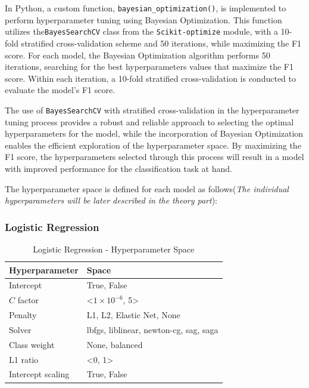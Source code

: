 In Python, a custom function, \lstinline{bayesian_optimization()}, is implemented to perform hyperparameter tuning using Bayesian Optimization.
This function utilizes the\lstinline{BayesSearchCV} class from the \lstinline{Scikit-optimize} module, with a 10-fold stratified cross-validation scheme and 50 iterations, while maximizing the F1 score.
For each model, the Bayesian Optimization algorithm performs 50 iterations, searching for the best hyperparameters values that maximize the F1 score. Within each iteration, a 10-fold stratified cross-validation is conducted to evaluate the model's F1 score.

The use of \lstinline{BayesSearchCV} with stratified cross-validation in the hyperparameter tuning process provides a robust and reliable approach to selecting the optimal hyperparameters for the model, while the incorporation of Bayesian Optimization enables the efficient exploration of the hyperparameter space.
By maximizing the F1 score, the hyperparameters selected through this process will result in a model with improved performance for the classification task at hand.

The hyperparameter space is defined for each model as follows(\textit{The individual hyperparameters will be later described in the theory part}):
\subsubsection{Logistic Regression}

\begin{table}[H]
    \small
    \setlength{\tabcolsep}{8pt}
    \renewcommand{\arraystretch}{1.3}
    \centering
        \caption[Logistic Regression - Hyperparameter Space]{Logistic Regression - Hyperparameter Space}\label{tab:lrspace}
        \begin{tabular}{ll}
    \toprule
    \textbf{Hyperparameter} & \textbf{Space}\\
    \midrule
    \hline
    Intercept & True, False \\
    $C$ factor & <$1\times10^{-6}$, 5>\\
    Penalty & L1, L2, Elastic Net, None \\
    Solver & lbfgs, liblinear, newton-cg, sag, saga \\
    Class weight & None, balanced \\
    L1 ratio & <0, 1> \\
    Intercept scaling & True, False  \\
    \hline
    \bottomrule
    \end{tabular}
    \vspace{0.7em}

    \vspace{-1em}
\end{table}


